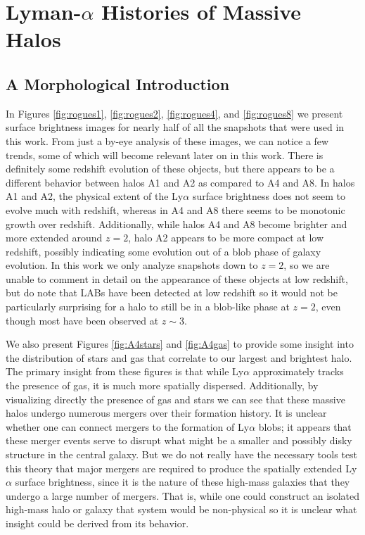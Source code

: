 \chapter{Lyman-\texorpdfstring{$\alpha$}{a} Histories of Massive Halos}

\section{A Morphological Introduction}

In Figures \ref{fig:rogues1}, \ref{fig:rogues2}, \ref{fig:rogues4}, and \ref{fig:rogues8} we present surface brightness images for nearly half of all the snapshots that were used in this work.
From just a by-eye analysis of these images, we can notice a few trends, some of which will become relevant later on in this work.
There is definitely some redshift evolution of these objects, but there appears to be a different behavior between halos A1 and A2 as compared to A4 and A8.
In halos A1 and A2, the physical extent of the Ly$\alpha$ surface brightness does not seem to evolve much with redshift, whereas in A4 and A8 there seems to be monotonic growth over redshift.
Additionally, while halos A4 and A8 become brighter and more extended around $z=2$, halo A2 appears to be more compact at low redshift, possibly indicating some evolution out of a blob phase of galaxy evolution.
In this work we only analyze snapshots down to $z=2$, so we are unable to comment in detail on the appearance of these objects at low redshift, but do note that LABs have been detected at low redshift \citep{Barger2012,Prescott2013} so it would not be particularly surprising for a halo to still be in a blob-like phase at $z=2$, even though most have been observed at $z\sim3$.

We also present Figures \ref{fig:A4stars} and \ref{fig:A4gas} to provide some insight into the distribution of stars and gas that correlate to our largest and brightest halo.
The primary insight from these figures is that while Ly$\alpha$ approximately tracks the presence of gas, it is much more spatially dispersed.
Additionally, by visualizing directly the presence of gas and stars we can see that these massive halos undergo numerous mergers over their formation history.
It is unclear whether one can connect mergers to the formation of Ly$\alpha$ blobs; it appears that these merger events serve to disrupt what might be a smaller and possibly disky structure in the central galaxy.
But we do not really have the necessary tools test this theory that major mergers are required to produce the spatially extended Ly$\alpha$ surface brightness, since it is the nature of these high-mass galaxies that they undergo a large number of mergers.
That is, while one could construct an isolated high-mass halo or galaxy that system would be non-physical so it is unclear what insight could be derived from its behavior.

